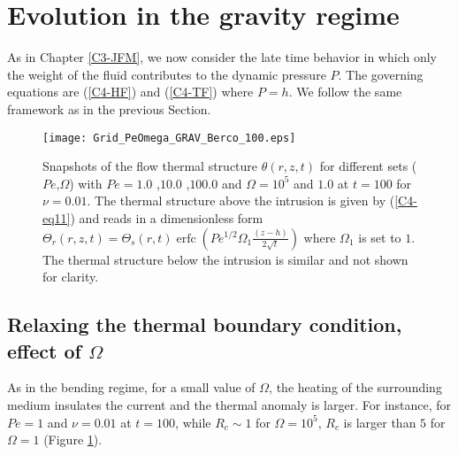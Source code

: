 \section{Evolution in the gravity regime}
\label{C4-sec:evol-grav-regime}

As in Chapter \ref{C3-JFM}, we now  consider the late time behavior in
which only the weight of the fluid contributes to the dynamic pressure
$P$. The governing equations are (\ref{C4-HF}) and (\ref{C4-TF}) where
$P=h$. We follow the same framework as in the previous Section.

\begin{figure}[h!]
  \begin{center}
    \graphicspath{ {/Users/thorey/Documents/These/Projet/Refroidissement/Skin_Model/Figure/Figure_Heating/} }
    \texttt{[image: Grid\_PeOmega\_GRAV\_Berco\_100.eps]}
    \caption{Snapshots of  the flow thermal  structure $\theta(r,z,t)$
      for  different  sets  ($Pe$,$\Omega$)  with  $Pe=  1.0$  ,$10.0$
      ,$100.0$   and   $\Omega=10^5$   and  $1.0$   at   $t=100$   for
      $\nu=0.01$. The  thermal structure above the  intrusion is given
      by   (\ref{C4-eq11})  and   reads   in   a  dimensionless   form
      $\Theta_r(r,z,t)=\Theta_s(r,t)\operatorname{erfc}{\left(Pe^{1/2}\Omega_1\frac{(z-h)}{2\sqrt{t}}\right)}$
      where $\Omega_1$ is set to  $1$. The thermal structure below the
      intrusion is similar and not shown for clarity.}
    \label{C4-Grid_PeOmega_Heating_GRAV}
  \end{center}
\end{figure}

\subsection{Relaxing  the   thermal  boundary  condition,   effect  of
  $\Omega$}
\label{C4-sec:infl-therm-bound-gr}

As in the  bending regime, for a small value  of $\Omega$, the heating
of  the  surrounding medium  insulates  the  current and  the  thermal
anomaly is larger. For instance, for $Pe=1$ and $\nu=0.01$ at $t=100$,
while  $R_c\sim 1$  for $\Omega=10^5$,  $R_c$ is  larger than  $5$ for
$\Omega =1 $ (Figure \ref{C4-Grid_PeOmega_Heating_GRAV}).  

